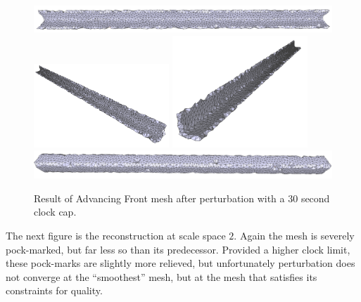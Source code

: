 \documentclass[12pt]{drexelthesis}
\begin{document}
\begin{figure}[!ht]
	\centering
		\includegraphics[width=5in]{simulated-lab-scan/0noise/optimizedNeat/advancingfrontperturb00.png}
		\includegraphics[width=2in]{simulated-lab-scan/0noise/optimizedNeat/advancingfrontperturb01.png}
		\includegraphics[width=2in]{simulated-lab-scan/0noise/optimizedNeat/advancingfrontperturb02.png}
		\includegraphics[width=5in]{simulated-lab-scan/0noise/optimizedNeat/advancingfrontperturb03.png}
		\caption[Advancing Front mesh after perturbation with a 30 second clock cap]{\centering  Result of Advancing Front mesh after perturbation with a 30 second clock cap.}
	\label{zeronoise:advancedperturb}
\end{figure}

The next figure is the reconstruction at scale space $2$. Again the mesh is severely pock-marked, but far less so than its predecessor. Provided a higher clock limit, these pock-marks are slightly more relieved, but unfortunately perturbation does not converge at the ``smoothest'' mesh, but at the mesh that satisfies its constraints for quality.
\end{document}
